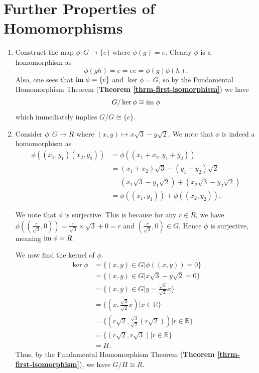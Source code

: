 \section{Further Properties of Homomorphisms}
\begin{enumerate}
    \item Construct the map $\phi: G \to \{e\}$ where $\phi(g) = e$. Clearly $\phi$ is a homomorphism as
    \[
        \phi(gh) = e = ee = \phi(g)\phi(h).
    \]
    Also, one sees that $\mathrm{im}\;\phi = \{e\}$ and $\ker\phi = G$, so by the Fundamental Homomorphism Theorem (\textbf{Theorem \ref{thrm-first-isomorphism}}) we have
    \[
        G / \ker\phi \cong \mathrm{im}\;\phi
    \]
    which immediately implies $G/G \cong \{e\}$.

    \item Consider $\phi: G \to R$ where $(x, y) \mapsto x\sqrt3 - y\sqrt2$. We note that $\phi$ is indeed a homomorphism as
    \begin{align*}
        \phi((x_1,y_1)(x_2,y_2)) &= \phi((x_1+x_2,y_1+y_2))\\
        &= (x_1+x_2)\sqrt3 - (y_1+y_2)\sqrt2\\
        &= (x_1\sqrt3 - y_1\sqrt2) + (x_2\sqrt3 - y_2\sqrt2)\\
        &= \phi((x_1, y_1)) + \phi((x_2, y_2)).
    \end{align*}
    
    We note that $\phi$ is surjective. This is because for any $r \in R$, we have $\phi((\frac{r}{\sqrt3}, 0)) = \frac{r}{\sqrt3} \times \sqrt3 + 0 = r$ and $(\frac{r}{\sqrt3}, 0) \in G$. Hence $\phi$ is surjective, meaning $\mathrm{im}\;\phi = R$.
    
    We now find the kernel of $\phi$.
    \begin{align*}
        \ker\phi &= \{(x, y) \in G \vert \phi((x, y)) = 0\}\\
        &= \{(x, y) \in G \vert x\sqrt3-y\sqrt2 = 0\}\\
        &= \{(x, y) \in G \vert y = \frac{\sqrt{3}}{\sqrt{2}}x\}\\
        &= \{(x, \frac{\sqrt{3}}{\sqrt{2}}x) \vert x \in \mathbb{R}\}\\
        &= \{(r\sqrt2, \frac{\sqrt{3}}{\sqrt{2}}(r\sqrt2)) \vert r \in \mathbb{R}\}\\
        &= \{(r\sqrt2, r\sqrt3) \vert r \in \mathbb{R}\}\\
        &= H.
    \end{align*}
    Thus, by the Fundamental Homomorphism Theorem (\textbf{Theorem \ref{thrm-first-isomorphism}}), we have $G / H \cong R$.


\end{enumerate}
